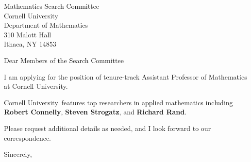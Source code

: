 




	
	
	\def\School{Cornell University}
	
	\begin{letter}
		{Mathematics Search Committee\\
			Cornell University\\
			Department of Mathematics\\
			310 Malott Hall\\
			Ithaca, NY 14853\\
		}
		
		\opening{Dear Members of the Search Committee}
		
		
		I am applying for the position of tenure-track Assistant Professor of Mathematics at \School. 
		
		
		
		\School~features top researchers in applied mathematics including \textbf{Robert Connelly}, \textbf{Steven Strogatz}, and \textbf{Richard Rand}. 
		
		
		
		
		
		Please request additional details as needed, and I look forward to our correspondence.
		
		\closing{Sincerely,}
	\end{letter}
